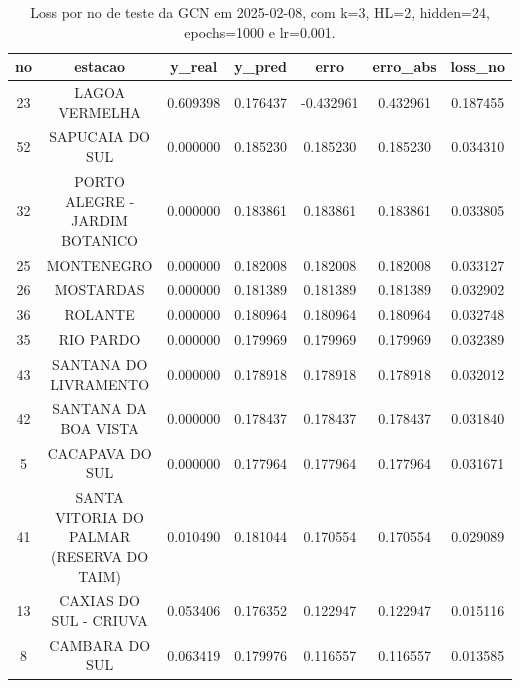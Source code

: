 \begin{table}[h]
\centering
\caption{Loss por no de teste da GCN em 2025-02-08, com k=3, HL=2, hidden=24, epochs=1000 e lr=0.001.}
\label{tab:gcn_loss_k3_hl2_h24_e1000_d20250208}
\begin{tabular}{ccccccc}
\toprule
no & estacao & y\_real & y\_pred & erro & erro\_abs & loss\_no \\
\midrule
23 & LAGOA VERMELHA & 0.609398 & 0.176437 & -0.432961 & 0.432961 & 0.187455 \\
52 & SAPUCAIA DO SUL & 0.000000 & 0.185230 & 0.185230 & 0.185230 & 0.034310 \\
32 & PORTO ALEGRE - JARDIM BOTANICO & 0.000000 & 0.183861 & 0.183861 & 0.183861 & 0.033805 \\
25 & MONTENEGRO & 0.000000 & 0.182008 & 0.182008 & 0.182008 & 0.033127 \\
26 & MOSTARDAS & 0.000000 & 0.181389 & 0.181389 & 0.181389 & 0.032902 \\
36 & ROLANTE & 0.000000 & 0.180964 & 0.180964 & 0.180964 & 0.032748 \\
35 & RIO PARDO & 0.000000 & 0.179969 & 0.179969 & 0.179969 & 0.032389 \\
43 & SANTANA DO LIVRAMENTO & 0.000000 & 0.178918 & 0.178918 & 0.178918 & 0.032012 \\
42 & SANTANA DA BOA VISTA & 0.000000 & 0.178437 & 0.178437 & 0.178437 & 0.031840 \\
5 & CACAPAVA DO SUL & 0.000000 & 0.177964 & 0.177964 & 0.177964 & 0.031671 \\
41 & SANTA VITORIA DO PALMAR (RESERVA DO TAIM) & 0.010490 & 0.181044 & 0.170554 & 0.170554 & 0.029089 \\
13 & CAXIAS DO SUL - CRIUVA & 0.053406 & 0.176352 & 0.122947 & 0.122947 & 0.015116 \\
8 & CAMBARA DO SUL & 0.063419 & 0.179976 & 0.116557 & 0.116557 & 0.013585 \\
\bottomrule
\end{tabular}
\end{table}
